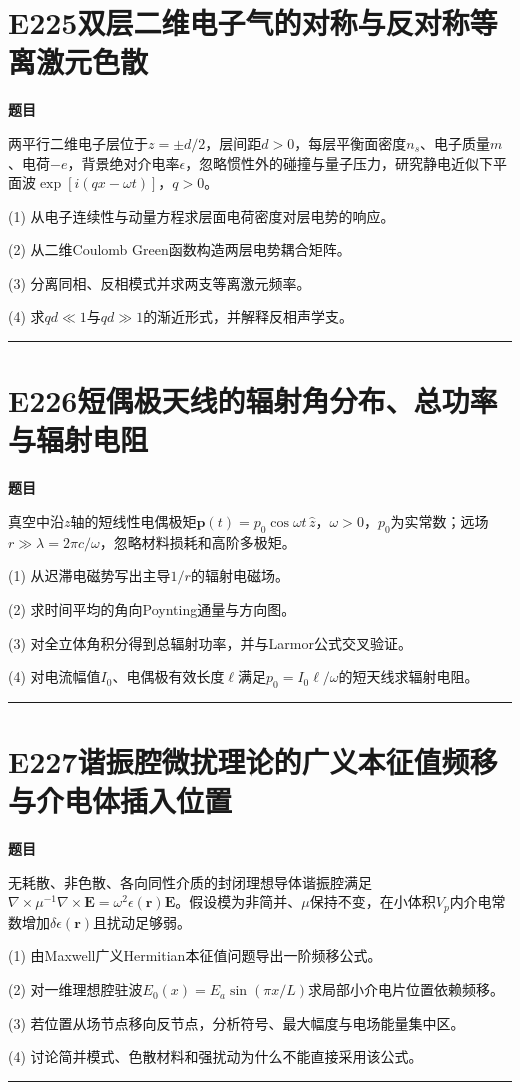 \documentclass[UTF8,a4paper,11pt,oneside,openany]{ctexbook}
\begin{document}
\section*{E225\quad 双层二维电子气的对称与反对称等离激元色散}
\textbf{题目}\par
两平行二维电子层位于$z=\pm d/2$，层间距$d>0$，每层平衡面密度$n_s$、电子质量$m$、电荷$-e$，背景绝对介电率$\epsilon$，忽略惯性外的碰撞与量子压力，研究静电近似下平面波$\exp[i(qx-\omega t)]$，$q>0$。
\par\smallskip\noindent (1) 从电子连续性与动量方程求层面电荷密度对层电势的响应。
\par\smallskip\noindent (2) 从二维Coulomb Green函数构造两层电势耦合矩阵。
\par\smallskip\noindent (3) 分离同相、反相模式并求两支等离激元频率。
\par\smallskip\noindent (4) 求$qd\ll1$与$qd\gg1$的渐近形式，并解释反相声学支。
\par\medskip\hrule\medskip
\section*{E226\quad 短偶极天线的辐射角分布、总功率与辐射电阻}
\textbf{题目}\par
真空中沿$z$轴的短线性电偶极矩$\boldsymbol p(t)=p_0\cos\omega t\,\hat z$，$\omega>0$，$p_0$为实常数；远场$r\gg\lambda=2\pi c/\omega$，忽略材料损耗和高阶多极矩。
\par\smallskip\noindent (1) 从迟滞电磁势写出主导$1/r$的辐射电磁场。
\par\smallskip\noindent (2) 求时间平均的角向Poynting通量与方向图。
\par\smallskip\noindent (3) 对全立体角积分得到总辐射功率，并与Larmor公式交叉验证。
\par\smallskip\noindent (4) 对电流幅值$I_0$、电偶极有效长度$\ell$满足$p_0=I_0\ell/\omega$的短天线求辐射电阻。
\par\medskip\hrule\medskip
\section*{E227\quad 谐振腔微扰理论的广义本征值频移与介电体插入位置}
\textbf{题目}\par
无耗散、非色散、各向同性介质的封闭理想导体谐振腔满足$\nabla\times\mu^{-1}\nabla\times\boldsymbol E=\omega^2\epsilon(\boldsymbol r)\boldsymbol E$。假设模为非简并、$\mu$保持不变，在小体积$V_p$内介电常数增加$\delta\epsilon(\boldsymbol r)$且扰动足够弱。
\par\smallskip\noindent (1) 由Maxwell广义Hermitian本征值问题导出一阶频移公式。
\par\smallskip\noindent (2) 对一维理想腔驻波$E_0(x)=E_a\sin(\pi x/L)$求局部小介电片位置依赖频移。
\par\smallskip\noindent (3) 若位置从场节点移向反节点，分析符号、最大幅度与电场能量集中区。
\par\smallskip\noindent (4) 讨论简并模式、色散材料和强扰动为什么不能直接采用该公式。
\par\medskip\hrule\medskip
\end{document}
